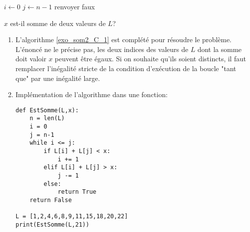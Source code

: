\begin{algorithm}
  $i\leftarrow 0$\;
  $j\leftarrow n-1$\;
   renvoyer faux\;
  \caption{$x$ est-il somme de deux valeurs de $L$?}
  \label{exo_som2_C_1}
\end{algorithm}

\begin{enumerate}
  \item L'algorithme \ref{exo_som2_C_1} est complété pour résoudre le problème. L'énoncé ne le précise pas, les deux indices des valeurs de $L$ dont la somme doit valoir $x$ peuvent être égaux. Si on souhaite qu'ils soient distincts, il faut remplacer l'inégalité stricte de la condition d'exécution de la boucle "tant que" par une inégalité large.
\item Implémentation de l'algorithme dans une fonction:
\begin{verbatim}
def EstSomme(L,x):
    n = len(L)
    i = 0
    j = n-1
    while i <= j:
        if L[i] + L[j] < x:
            i += 1
        elif L[i] + L[j] > x:
            j -= 1
        else:
            return True
    return False
    
L = [1,2,4,6,8,9,11,15,18,20,22]
print(EstSomme(L,21))
\end{verbatim}

\end{enumerate}
